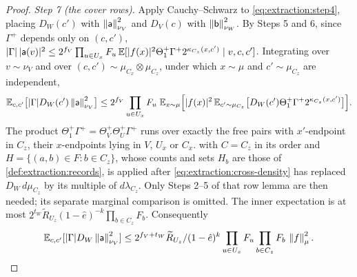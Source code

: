 \begin{proof}
\emph{Step 7 (the cover rows).} Apply Cauchy--Schwarz to
\eqref{eq:extraction:step4}, placing $D_W(c')$ with
$\left\|\mathsf a\right\|_{\nu_V}^2$ and $D_V(c)$ with
$\left\|\mathsf b\right\|_{\nu_W}^2$. By Steps 5 and 6, since $\Gamma^+$ depends only on
$(c,c')$,
$|\Gamma|\,|\mathsf a(v)|^2\le2^{f_V}\prod_{u\in U_x}F_u\,
\mathbb E[|f(x)|^2\Theta^+_1\Gamma^+2^{\kappa_{C_z}(x,c')}\mid v,c,c']$. Integrating over
$v\sim\nu_V$ and over $(c,c')\sim\mu_{C_x}\otimes\mu_{C_z}$, under which $x\sim\mu$
and $c'\sim\mu_{C_z}$ are independent,
\[
 \mathbb E_{c,c'}\bigl[|\Gamma|D_W(c')\left\|\mathsf a\right\|^2_{\nu_V}\bigr]\le2^{f_V}\prod_{u\in U_x}F_u\;
 \mathbb E_{x\sim\mu}\Bigl[|f(x)|^2\,\mathbb E_{c'\sim\mu_{C_z}}
 \bigl[D_W(c')\Theta^+_1\Gamma^+2^{\kappa_{C_z}(x,c')}\bigr]\Bigr].
\]
The product $\Theta^+_1\Gamma^+=\Theta^+_V\Theta^+_U\Gamma^+$ runs over exactly the
free pairs with $x'$-endpoint in $C_z$, their $x$-endpoints lying in $V$, $U_x$ or
$C_x$.  with $C=C_z$ in its order and
$H=\{(a,b)\in F:b\in C_z\}$, whose counts and sets $H_b$ are those of
\cref{def:extraction:records}, is applied after
\eqref{eq:extraction:cross-density} has replaced
$D_W\,d\mu_{C_z}$ by its multiple of $d\lambda_{C_z}$.
Only Steps 2--5 of that row lemma are then needed; its separate
marginal comparison is omitted. The inner expectation is at most
$2^{t_W}\widetilde R_{U_z}(1-\hat e)^{-k}\prod_{b\in C_z}F_b$.
Consequently
\[
 \mathbb E_{c,c'}[|\Gamma|D_W\left\|\mathsf a\right\|^2_{\nu_V}]
 \le2^{f_V+t_W}\widetilde R_{U_z}/(1-\hat e)^k
 \prod_{u\in U_x}F_u\prod_{b\in C_z}F_b\,\left\|f\right\|_\mu^2.
\]


\end{proof}
